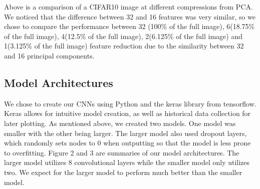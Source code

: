 \documentclass{article}
\begin{document}
Above is a comparison of a CIFAR10 image at different compressions from PCA. We noticed that the difference between 32 and 16 features was very similar, so we chose to compare the performance between 32 (100\% of the full image), 6(18.75\% of the full image), 4(12.5\% of the full image), 2(6.125\% of the full image) and 1(3.125\% of the full image) feature reduction due to the similarity between 32 and 16 principal components. 
\subsection{Model Architectures}
We chose to create our CNNs using Python and the keras library from tensorflow. Keras allows for intuitive model creation, as well as historical data collection for later plotting. As mentioned above, we created two models. One model was smaller with the other being larger. The larger model also used dropout layers, which randomly sets nodes to 0 when outputting so that the model is less prone to overfitting. Figure 2 and 3 are summaries of our model architectures. The larger model utilizes 8 convolutional layers while the smaller model only utilizes two. We expect for the larger model to perform much better than the smaller model.
\end{document}
